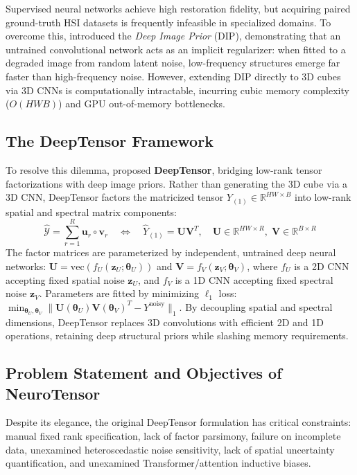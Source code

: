 Supervised neural networks achieve high restoration fidelity, but acquiring paired ground-truth HSI datasets is frequently infeasible in specialized domains. To overcome this, \citet{ulyanov2018deep} introduced the \textit{Deep Image Prior} (DIP), demonstrating that an untrained convolutional network acts as an implicit regularizer: when fitted to a degraded image from random latent noise, low-frequency structures emerge far faster than high-frequency noise. However, extending DIP directly to 3D cubes via 3D CNNs is computationally intractable, incurring cubic memory complexity ($O(HWB)$) and GPU out-of-memory bottlenecks.

\subsection{The DeepTensor Framework}
To resolve this dilemma, \citet{heckel2020deeptensor, heckel2022deeptensor_arxiv} proposed \textbf{DeepTensor}, bridging low-rank tensor factorizations with deep image priors. Rather than generating the 3D cube via a 3D CNN, DeepTensor factors the matricized tensor $Y_{(1)} \in \mathbb{R}^{HW \times B}$ into low-rank spatial and spectral matrix components:
\begin{equation}
\label{eq:deeptensor_cp_intro}
\hat{\mathcal{Y}} = \sum_{r=1}^R \mathbf{u}_r \circ \mathbf{v}_r \quad \Longleftrightarrow \quad \hat{Y}_{(1)} = \mathbf{U} \mathbf{V}^T, \quad \mathbf{U} \in \mathbb{R}^{HW \times R}, \; \mathbf{V} \in \mathbb{R}^{B \times R}
\end{equation}
The factor matrices are parameterized by independent, untrained deep neural networks: $\mathbf{U} = \text{vec}(f_U(\mathbf{z}_U; \boldsymbol{\theta}_U))$ and $\mathbf{V} = f_V(\mathbf{z}_V; \boldsymbol{\theta}_V)$, where $f_U$ is a 2D CNN accepting fixed spatial noise $\mathbf{z}_U$, and $f_V$ is a 1D CNN accepting fixed spectral noise $\mathbf{z}_V$. Parameters are fitted by minimizing $\ell_1$ loss: $\min_{\boldsymbol{\theta}_U, \boldsymbol{\theta}_V} \|\mathbf{U}(\boldsymbol{\theta}_U) \mathbf{V}(\boldsymbol{\theta}_V)^T - Y^\text{noisy}\|_1$. By decoupling spatial and spectral dimensions, DeepTensor replaces 3D convolutions with efficient 2D and 1D operations, retaining deep structural priors while slashing memory requirements.

\subsection{Problem Statement and Objectives of NeuroTensor}
Despite its elegance, the original DeepTensor formulation has critical constraints: manual fixed rank specification, lack of factor parsimony, failure on incomplete data, unexamined heteroscedastic noise sensitivity, lack of spatial uncertainty quantification, and unexamined Transformer/attention inductive biases.

